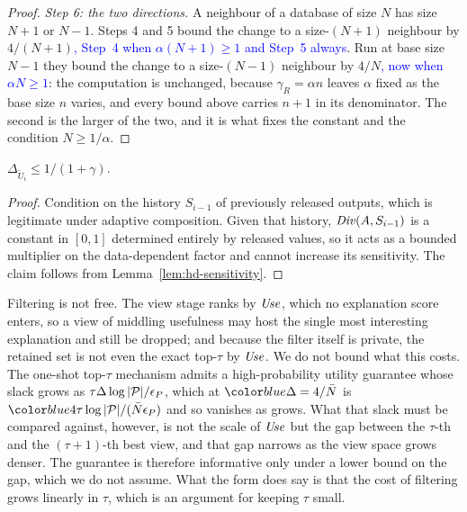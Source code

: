 \begin{proof}
{\emph{Step 6: the two directions.}
A neighbour of a database of size $N$ has size $N+1$ or $N-1$.
Steps 4 and 5 bound the change to a size-$(N+1)$ neighbour by $4/(N+1)$\textcolor{blue}{, Step~4 when
$\alpha(N+1)\ge1$ and Step~5 always}.
Run at base size $N-1$ they bound the change to a size-$(N-1)$ neighbour by $4/N$\textcolor{blue}{, now
when $\alpha N\ge1$}: the
computation is unchanged, because $\gamma_R=\alpha n$ leaves $\alpha$ fixed as the base size $n$
varies, and every bound above carries $n+1$ in its denominator.
The second is the larger of the two, and it is what fixes the constant and the
condition $N\ge1/\alpha$.}
\end{proof}


\begin{lemma}
\label{lem:selection-utility}
$\Delta_{\widetilde{U}_i}\le 1/(1+\gamma)$.
\end{lemma}

\begin{proof}
Condition on the history $S_{i-1}$ of previously released outputs, which is legitimate under adaptive composition.
Given that history, $\mathit{Div}(A,S_{i-1})$ is a constant in $[0,1]$ determined entirely by released values, so it acts as a bounded multiplier on the data-dependent factor and cannot increase its sensitivity.
The claim follows from Lemma~\ref{lem:hd-sensitivity}.
\end{proof}

Filtering is not free.
The view stage ranks by $\mathit{Use}$, which no explanation score enters, so a view of middling usefulness may host the single most interesting explanation and still be dropped; and because the filter itself is private, the retained set is not even the exact top-$\tau$ by $\mathit{Use}$.
We do not bound what this costs.
The one-shot top-$\tau$ mechanism admits a high-probability utility guarantee whose slack grows as $\tau\Delta\log|\mathcal{P}|/\epsilon_P$, which at $\added{\Delta=4/\bar N}$ is $\added{4\tau\log|\views|/(\bar N\epsilon_P)}$ and so vanishes as  grows.
What that slack must be compared against, however, is not the scale of $\mathit{Use}$ but the gap between the $\tau$-th and the $(\tau{+}1)$-th best view, and that gap narrows as the view space grows denser.
The guarantee is therefore informative only under a lower bound on the gap, which we do not assume.
What the form does say is that the cost of filtering grows linearly in $\tau$, which is an argument for keeping $\tau$ small.


